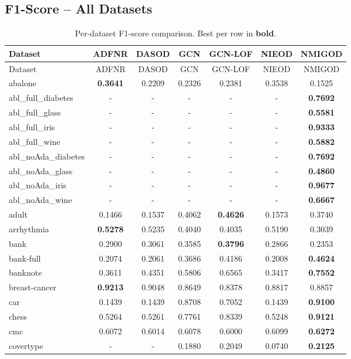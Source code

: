 \documentclass[11pt,a4paper]{article}
\begin{document}
\subsection{F1-Score -- All Datasets}
\begin{longtable}{lcccccc}
\caption{Per-dataset F1-score comparison. Best per row in \textbf{bold}.}\\
\toprule
Dataset & ADFNR & DASOD & GCN & GCN-LOF & NIEOD & NMIGOD \\
\midrule
\endfirsthead
\toprule Dataset & ADFNR & DASOD & GCN & GCN-LOF & NIEOD & NMIGOD \\ \midrule
\endhead
abalone & \textbf{0.3641} & 0.2209 & 0.2326 & 0.2381 & 0.3538 & 0.1525 \\
abl\_full\_diabetes & - & - & - & - & - & \textbf{0.7692} \\
abl\_full\_glass & - & - & - & - & - & \textbf{0.5581} \\
abl\_full\_iris & - & - & - & - & - & \textbf{0.9333} \\
abl\_full\_wine & - & - & - & - & - & \textbf{0.5882} \\
abl\_noAda\_diabetes & - & - & - & - & - & \textbf{0.7692} \\
abl\_noAda\_glass & - & - & - & - & - & \textbf{0.4860} \\
abl\_noAda\_iris & - & - & - & - & - & \textbf{0.9677} \\
abl\_noAda\_wine & - & - & - & - & - & \textbf{0.6667} \\
adult & 0.1466 & 0.1537 & 0.4062 & \textbf{0.4626} & 0.1573 & 0.3740 \\
arrhythmia & \textbf{0.5278} & 0.5235 & 0.4040 & 0.4035 & 0.5190 & 0.3039 \\
bank & 0.2900 & 0.3061 & 0.3585 & \textbf{0.3796} & 0.2866 & 0.2353 \\
bank-full & 0.2074 & 0.2061 & 0.3686 & 0.4186 & 0.2008 & \textbf{0.4624} \\
banknote & 0.3611 & 0.4351 & 0.5806 & 0.6565 & 0.3417 & \textbf{0.7552} \\
breast-cancer & \textbf{0.9213} & 0.9048 & 0.8649 & 0.8378 & 0.8817 & 0.8857 \\
car & 0.1439 & 0.1439 & 0.8708 & 0.7052 & 0.1439 & \textbf{0.9100} \\
chess & 0.5264 & 0.5261 & 0.7761 & 0.8339 & 0.5248 & \textbf{0.9121} \\
cmc & 0.6072 & 0.6014 & 0.6078 & 0.6000 & 0.6099 & \textbf{0.6272} \\
covertype & - & - & 0.1880 & 0.2049 & 0.0740 & \textbf{0.2125} \\

\end{longtable}
\end{document}
